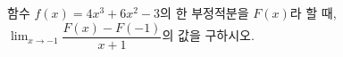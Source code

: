 함수 $f(x)=4x^3+6x^2-3$의 한 부정적분을 $F(x)$라 할 때, $\displaystyle\lim_{x\to -1}\dfrac{F(x)-F(-1)}{x+1}$의 값을 구하시오.
